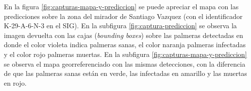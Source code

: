 En la figura \ref{fig:capturas-mapa-y-prediccion} se puede apreciar el mapa con las predicciones sobre la zona del mirador de Santiago Vazquez (con el identificador K-29-A-6-N-3 en el SIG). En la subfigura \ref{fig:captura-prediccion} se observa la imagen devuelta con las cajas (\textit{bounding boxes}) sobre las palmeras detectadas en donde el color violeta indica palmeras sanas, el color naranja palmeras infectadas y el color rojo palmeras muertas. En la subfigura \ref{fig:capturas-mapa-y-prediccion} se observa el mapa georreferenciado con las mismas detecciones, con la diferencia de que las palmeras sanas están en verde, las infectadas en amarillo y las muertas en rojo. 





